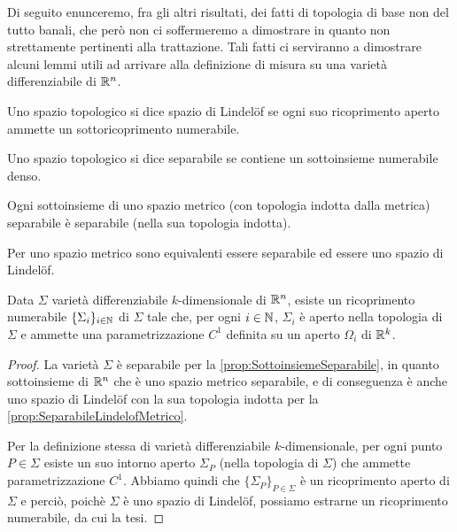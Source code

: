 Di seguito enunceremo, fra gli altri risultati, dei fatti di topologia di base non del tutto banali, che però non ci soffermeremo a dimostrare in quanto non strettamente pertinenti alla trattazione. Tali fatti ci serviranno a dimostrare alcuni lemmi utili ad arrivare alla definizione di misura su una varietà differenziabile di $\mathbb R^n$.

\begin{definition}
	Uno spazio topologico si dice spazio di Lindelöf se ogni suo ricoprimento aperto ammette un sottoricoprimento numerabile. 
\end{definition}

\begin{definition}
	Uno spazio topologico si dice separabile se contiene un sottoinsieme numerabile denso.
\end{definition}

\begin{proposition}\label{prop:SottoinsiemeSeparabile}
	Ogni sottoinsieme di uno spazio metrico (con topologia indotta dalla metrica) separabile è separabile (nella sua topologia indotta).
\end{proposition}

\begin{proposition}\label{prop:SeparabileLindelofMetrico}
	Per uno spazio metrico sono equivalenti essere separabile ed essere uno spazio di Lindelöf.
\end{proposition}

\begin{lemma}\label{lemma:SottovarietaUnioneNumerabile}
	Data $\Sigma$ varietà differenziabile $k$-dimensionale di $\mathbb R^n$, esiste un ricoprimento numerabile  $\{\Sigma_i\}_{i\in\mathbb N}$ di $\Sigma$ tale che, per ogni $i\in\mathbb N$, $\Sigma_i$ è aperto nella topologia di $\Sigma$ e ammette una parametrizzazione $C^1$ definita su un aperto $\Omega_i$ di $\mathbb R^k$.
\end{lemma}
\begin{proof}
	La varietà $\Sigma$ è separabile per la \cref{prop:SottoinsiemeSeparabile}, in quanto sottoinsieme di $\mathbb R^n$ che è uno spazio metrico separabile, e di conseguenza è anche uno spazio di Lindelöf con la sua topologia indotta per la \cref{prop:SeparabileLindelofMetrico}.
	
	Per la definizione stessa di varietà differenziabile $k$-dimensionale, per ogni punto $P\in\Sigma$ esiste un suo intorno aperto $\Sigma_P$ (nella topologia di $\Sigma$) che ammette parametrizzazione $C^1$. Abbiamo quindi che $\{\Sigma_P\}_{P\in\Sigma}$ è un ricoprimento aperto di $\Sigma$ e perciò, poichè $\Sigma$ è uno spazio di Lindelöf, possiamo estrarne un ricoprimento numerabile, da cui la tesi.
\end{proof}

